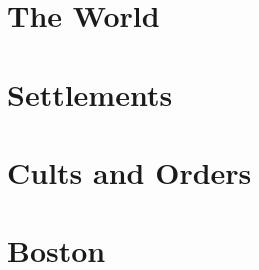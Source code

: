 \documentclass[./main.tex]{subfiles}
\begin{document}

\chapter{The World}

\chapter{Settlements}











\chapter{Cults and Orders}



\chapter{Boston}

\end{document}
